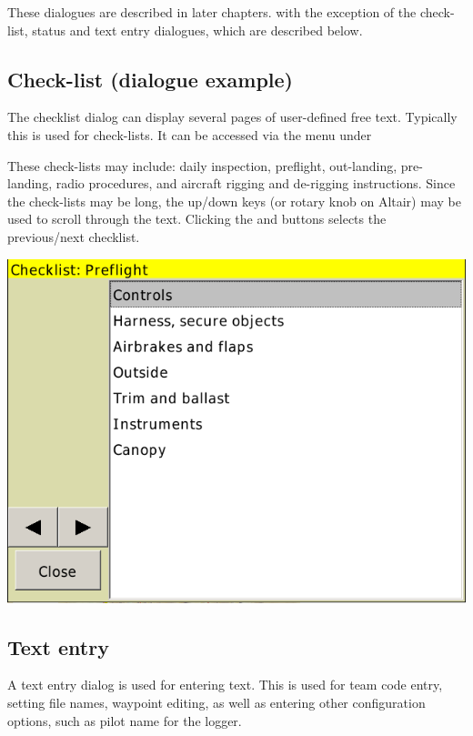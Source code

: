 These dialogues are described in later chapters. with the exception of the
check-list, status and text entry dialogues, which are described below.

\subsection*{Check-list (dialogue example)}\label{sec:checklist}
The checklist dialog can display several pages of user-defined free text.
Typically this is used for check-lists. It can be accessed via the menu under 
\begin{quote}
\blink{}
\end{quote}

These check-lists may include: daily inspection, preflight, out-landing,
pre-landing, radio procedures, and aircraft rigging and de-rigging
instructions.  Since the check-lists may be long, the up/down keys (or rotary
knob on Altair) may be used to scroll through the text. Clicking the
\button{$<$} and \button{$>$} buttons selects the previous/next checklist.

\begin{center}
\includegraphics[angle=0,width=0.8\linewidth,keepaspectratio='true']{figures/checklist.png}
\end{center}


\subsection*{Text entry} \label{sec:textentry}
A text entry dialog is used for entering text.  This is used for team
code entry, setting file names, waypoint editing, as well as entering
other configuration options, such as pilot name for the logger.

